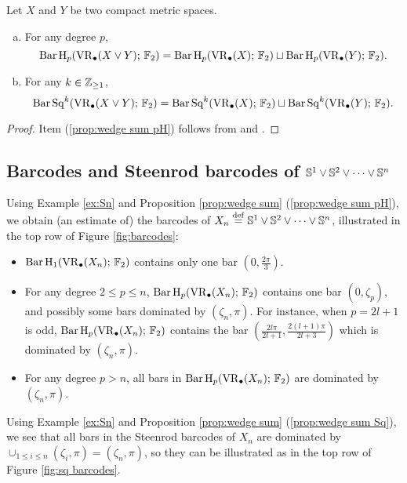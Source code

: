 \begin{proposition}\label{prop:wedge sum}
	Let $X$ and $Y$ be two compact metric spaces.
	\begin{enumerate}[(a)]
		\item\label{prop:wedge sum pH} For any degree $p$,
		\begin{equation*}\label{eq:wedge sum pH}
			\operatorname{Bar} \operatorname{H}_{p}(\operatorname{VR}_\bullet(X\vee Y);\,{\mathbb{F}_2})= \operatorname{Bar} \operatorname{H}_{p}(\operatorname{VR}_\bullet(X);\,{\mathbb{F}_2})\sqcup \operatorname{Bar} \operatorname{H}_{p}(\operatorname{VR}_\bullet(Y);\,{\mathbb{F}_2}).
		\end{equation*}
		\item\label{prop:wedge sum Sq} For any $k\in \mathbb{Z}_{\geq 1}$,
		\begin{equation*}\label{eq:wedge sum Sq}
			\operatorname{Bar}\operatorname{Sq}^{k}(\operatorname{VR}_\bullet(X\vee Y);\,{\mathbb{F}_2})= \operatorname{Bar}\operatorname{Sq}^{k}(\operatorname{VR}_\bullet(X);\,{\mathbb{F}_2})\sqcup \operatorname{Bar}\operatorname{Sq}^{k}(\operatorname{VR}_\bullet(Y);\,{\mathbb{F}_2}).
		\end{equation*}
	\end{enumerate}
\end{proposition}
\begin{proof}
	Item (\ref{prop:wedge sum pH}) follows from \cite[Proposition 3.7]{adamaszek2020homotopy} and \cite[Thoerem 9 (2)]{lim2020vietoris}.

\end{proof}

\subsection{Barcodes and Steenrod barcodes of $\mathbb{S}^1\vee\mathbb{S}^2\vee\dots\vee\mathbb{S}^n$}

Using Example \ref{ex:Sn} and Proposition \ref{prop:wedge sum} (\ref{prop:wedge sum pH}), we obtain (an estimate of) the barcodes of $X_n\stackrel{\mathrm{def}}{=} \mathbb{S}^1\vee\mathbb{S}^2\vee\dots\vee\mathbb{S}^n$, illustrated in the top row of Figure \ref{fig:barcodes}:
\begin{itemize}
	\item $\operatorname{Bar} \operatorname{H}_{1}(\operatorname{VR}_\bullet(X_n);\,{\mathbb{F}_2})$ contains only one bar $\left(0,\frac{2\pi}{3}\right)$.
	\item For any degree $2\leq p\leq n$, $\operatorname{Bar} \operatorname{H}_{p}(\operatorname{VR}_\bullet(X_n);\,{\mathbb{F}_2})$ contains one bar $(0,\zeta_p)$, and possibly some bars dominated by $(\zeta_n,\pi)$. For instance, when $p=2l+1$ is odd, $\operatorname{Bar} \operatorname{H}_{p}(\operatorname{VR}_\bullet(X_n);\,{\mathbb{F}_2})$ contains the bar $( \frac{2l\pi}{2l+1},\frac{2(l+1)\pi}{2l+3})$ which is dominated by $(\zeta_n,\pi)$.
	\item For any degree $p>n$, all bars in $\operatorname{Bar} \operatorname{H}_{p}(\operatorname{VR}_\bullet(X_n);\,{\mathbb{F}_2})$ are dominated by $(\zeta_n,\pi)$.
\end{itemize}

Using Example \ref{ex:Sn} and Proposition \ref{prop:wedge sum} (\ref{prop:wedge sum Sq}), we see that all bars in the Steenrod barcodes of $X_n$ are dominated by $\cup_{1\leq i\leq n}(\zeta_i,\pi)=(\zeta_n,\pi)$, so they can be illustrated as in the top row of Figure \ref{fig:sq barcodes}.

